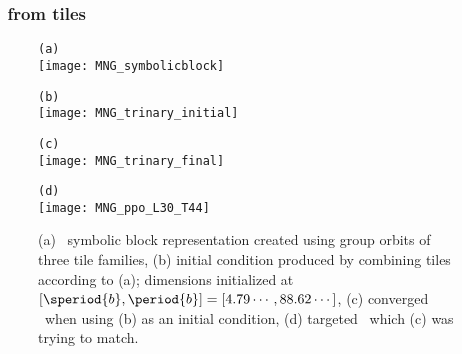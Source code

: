 \subsubsection{\twoTs\ from tiles}
\begin{figure}
\begin{minipage}[height=.4\textheight]{.5\textwidth}
\centering \small{\texttt{(a)}}\\
\texttt{[image: MNG\_symbolicblock]}
\end{minipage}
\begin{minipage}[height=.4\textheight]{.5\textwidth}
\centering \small{\texttt{(b)}}\\
\texttt{[image: MNG\_trinary\_initial]}
\end{minipage}
\begin{minipage}[height=.4\textheight]{.5\textwidth}
\centering \small{\texttt{(c)}}\\
\texttt{[image: MNG\_trinary\_final]}
\end{minipage}
\begin{minipage}[height=.4\textheight]{.5\textwidth}
\centering \small{\texttt{(d)}}\\
\texttt{[image: MNG\_ppo\_L30\_T44]}
\end{minipage}
\caption{ \label{fig:trinarytiling}
(a) \Spt\ symbolic block representation created using group orbits
of three tile families,
(b) initial condition produced by combining tiles according to (a);
dimensions initialized at $[\speriod{b},\period{b}]=[4.79\cdots,88.62\cdots]$,
(c) converged \twot\ when using (b) as an initial condition,
(d) targeted \twot\ which (c) was trying to match.
}
\end{figure}


